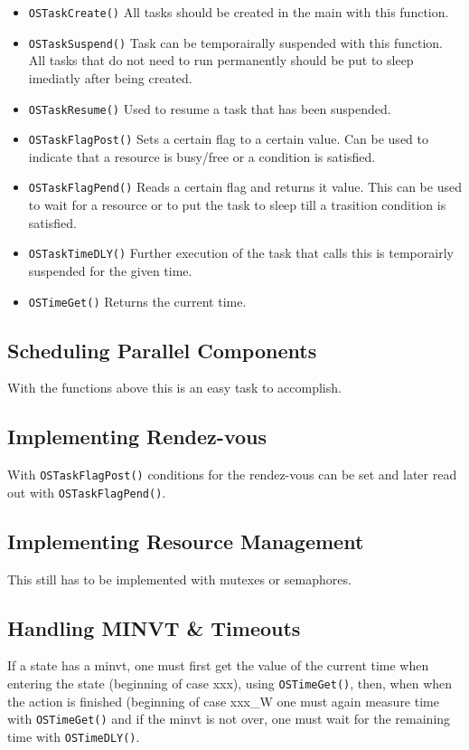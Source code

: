 \begin{itemize}
	\item \lstinline{OSTaskCreate()} All tasks should be created in the main with this function.
	\item \lstinline{OSTaskSuspend()} Task can be temporairally suspended with this function. All tasks that do not need to run permanently should be put to sleep imediatly after being created.
	\item \lstinline{OSTaskResume()} Used to resume a task that has been suspended.
	\item \lstinline{OSTaskFlagPost()} Sets a certain flag to a certain value. Can be used to indicate that a resource is busy/free or a condition is satisfied.
	\item \lstinline{OSTaskFlagPend()} Reads a certain flag and returns it value. This can be used to wait for a resource or to put the task to sleep till a trasition condition is satisfied.
	\item \lstinline{OSTaskTimeDLY()} Further execution of the task that calls this is temporairly suspended for the given time.
	\item \lstinline{OSTimeGet()} Returns the current time.
\end{itemize}

\subsection{Scheduling Parallel Components}
With the functions above this is an easy task to accomplish.
\subsection{Implementing Rendez-vous}
With \lstinline{OSTaskFlagPost()} conditions for the rendez-vous can be set and later read out with \lstinline{OSTaskFlagPend()}.
\subsection{Implementing Resource Management}
This still has to be implemented with mutexes or semaphores.

\subsection{Handling MINVT \& Timeouts}
If a state has a minvt, one must first get the value of the current time when entering the state (beginning of case xxx), using \lstinline{OSTimeGet()}, then, when when the action is finished (beginning of case xxx\_W one must again measure time with \lstinline{OSTimeGet()} and if the minvt is not over, one must wait for the remaining time with \lstinline{OSTimeDLY()}.

